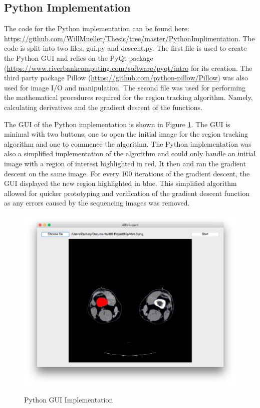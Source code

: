 \documentclass{article}
\begin{document}
      \subsection{Python Implementation}
      
	The code for the Python implementation can be found here: \url{https://github.com/WillMueller/Thesis/tree/master/PythonImplimentation}. The code is split into two files, gui.py and descent.py. The first file is used to create the Python GUI and relies on the PyQt package (\url{https://www.riverbankcomputing.com/software/pyqt/intro} for its creation. The third party package Pillow (\url{https://github.com/python-pillow/Pillow}) was also used for image I/O and manipulation. The second file was used for performing the mathematical procedures required for the region tracking algorithm. Namely, calculating derivatives and the gradient descent of the functions. 
        
	The GUI of the Python implementation is shown in Figure \ref{python_implementation}. The GUI is minimal with two buttons; one to open the initial image for the region tracking algorithm and one to commence the algorithm. The Python implementation was also a simplified implementation of the algorithm and could only handle an initial image with a region of interest highlighted in red. It then and ran the gradient descent on the same image. For every 100 iterations of the gradient descent, the GUI displayed the new region highlighted in blue. This simplified algorithm allowed for quicker prototyping and verification of the gradient descent function as any errors caused by the sequencing images was removed.
      
      \begin{figure}[!ht]
      \caption{Python GUI Implementation}
      \centering
        \includegraphics[width=1\textwidth]{python}
      \label{python_implementation}
        \end{figure}
        
\end{document}
